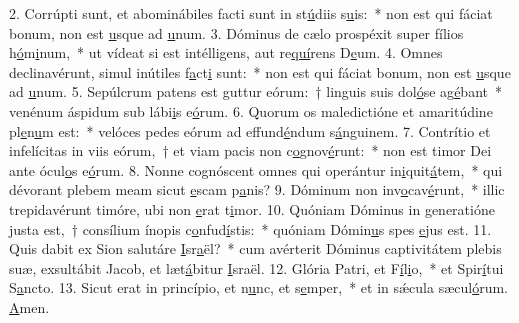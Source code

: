 2. Corrúpti sunt, et abominábiles facti sunt in st\uline{ú}diis s\uline{u}is:~* non est qui fáciat bonum, non est \uline{u}sque ad \uline{u}num.
3. Dóminus de cælo prospéxit super fílios h\uline{ó}m\uline{i}num,~* ut vídeat si est intélligens, aut re\uline{quí}rens D\uline{e}um.
4. Omnes declinavérunt, simul inútiles f\uline{a}ct\uline{i} sunt:~* non est qui fáciat bonum, non est \uline{u}sque ad \uline{u}num.
5. Sepúlcrum patens est guttur eórum:~† linguis suis dol\uline{ó}se ag\uline{é}bant~* venénum áspidum sub lábi\uline{i}s e\uline{ó}rum.
6. Quorum os maledictióne et amaritúdine pl\uline{e}n\uline{u}m est:~* velóces pedes eórum ad effund\uline{é}ndum s\uline{á}nguinem.
7. Contrítio et infelícitas in viis eórum,~† et viam pacis non c\uline{o}gnov\uline{é}runt:~* non est timor Dei ante ócul\uline{o}s e\uline{ó}rum.
8. Nonne cognóscent omnes qui operántur in\uline{i}quit\uline{á}tem,~* qui dévorant plebem meam sicut \uline{e}scam p\uline{a}nis?
9. Dóminum non inv\uline{o}cav\uline{é}runt,~* illic trepidavérunt timóre, ubi non \uline{e}rat t\uline{i}mor.
10. Quóniam Dóminus in generatióne justa est,~† consílium ínopis c\uline{o}nfud\uline{í}stis:~* quóniam Dómin\uline{u}s spes \uline{e}jus est.
11. Quis dabit ex Sion salutáre \uline{I}sr\uline{a}ël?~* cum avérterit Dóminus captivitátem plebis suæ, exsultábit Jacob, et læt\uline{á}bitur \uline{I}sraël.
12. Glória Patri, et F\uline{í}l\uline{i}o,~* et Spir\uline{í}tui S\uline{a}ncto.
13. Sicut erat in princípio, et n\uline{u}nc, et s\uline{e}mper,~* et in sǽcula sæcul\uline{ó}rum. \uline{A}men.
